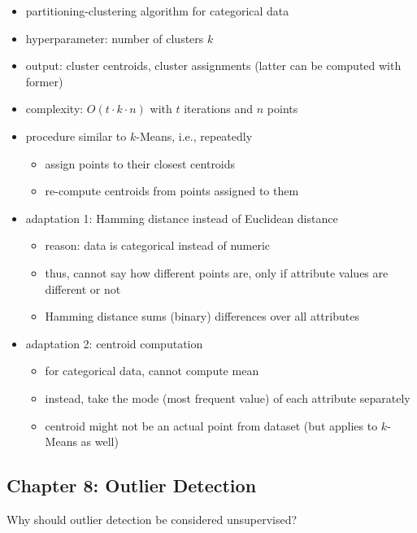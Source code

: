 \documentclass[12pt]{article}
\begin{document}
\begin{itemize}[left=0pt, nosep]
	\item partitioning-clustering algorithm for categorical data
	\item hyperparameter: number of clusters $k$
	\item output: cluster centroids, cluster assignments (latter can be computed with former)
	\item complexity: $O(t \cdot k \cdot n)$ with $t$ iterations and $n$ points
	\item procedure similar to $k$-Means, i.e., repeatedly
	\begin{itemize}[left=0pt, nosep]
		\item assign points to their closest centroids
		\item re-compute centroids from points assigned to them
	\end{itemize}
	\item adaptation 1: Hamming distance instead of Euclidean distance
	\begin{itemize}[left=0pt, nosep]
		\item reason: data is categorical instead of numeric
		\item thus, cannot say how different points are, only if attribute values are different or not
		\item Hamming distance sums (binary) differences over all attributes
	\end{itemize}
	\item adaptation 2: centroid computation
	\begin{itemize}[left=0pt, nosep]
		\item for categorical data, cannot compute mean
		\item instead, take the mode (most frequent value) of each attribute separately
		\item centroid might not be an actual point from dataset (but applies to $k$-Means as well)
	\end{itemize}
\end{itemize}

\subsection*{Chapter 8: Outlier Detection}

\begin{question}
	Why should outlier detection be considered unsupervised?
\end{question}
\end{document}
